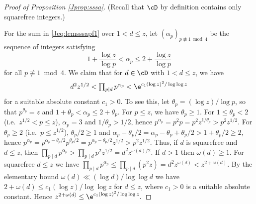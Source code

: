 \documentclass[12pt, reqno, twoside, letterpaper]{amsart}
\begin{document}
\begin{jetsam}
\begin{proof}[Proof of Proposition \ref{Jprop:sssa}]
\noindent 
(Recall that $\cD$ by definition contains only squarefree 
integers.)

For the sum in \eqref{Jeq:lemsssapf1} over $1 < d \le z$, let 
$(\alpha_p)_{p \not\equiv 1 \bmod 4}$ be the sequence of integers 
satisfying 
\[
 1 + \frac{\log z}{\log p}
  < 
   \alpha_p
    \le 
     2 + \frac{\log z}{\log p}
\]
for all $p \not\equiv 1 \bmod 4$.
%
We claim that for $d \in \cD$ with $1 < d \le z$, we have 
\begin{equation}
 \label{Jeq:dbnds}
  \textstyle 
   d^2z^{1/2}
   <
    \prod_{p \mid d} p^{\alpha_p}
     <
      \e^{c_1(\log z)^2/\log\log z} 
\end{equation}
for a suitable absolute constant $c_1 > 0$.
%
To see this, let $\theta_p = (\log z)/\log p$, so that 
$p^{\theta_p} = z$ and $1 + \theta_p < \alpha_p \le 2 + \theta_p$.
%
For $p \le z$, we have $\theta_p \ge 1$.
%
For $1 \le \theta_p < 2$ (i.e.\ $z^{1/2} < p \le z$), 
$\alpha_p = 3$ and $1/\theta_p > 1/2$, hence 
$
 p^{\alpha_p} 
  = 
   p^2p
    =
     p^2z^{1/\theta_p}
      >
       p^2z^{1/2}
$.
%
For $\theta_p \ge 2$ (i.e.\ $p \le z^{1/2}$), $\theta_p/2 \ge 1$ 
and 
$
 \alpha_p - \theta_p/2 
  = 
   \alpha_p - \theta_p + \theta_p/2
    > 1 + \theta_p/2
     \ge 
      2
$,
hence 
$
 p^{\alpha_p}
  =
   p^{\alpha_p - \theta_p/2}p^{\theta_p/2}
     =
      p^{\alpha_p - \theta_p/2}z^{1/2}
       > p^2z^{1/2}
$.
%
Thus, if $d$ is squarefree and $d \le z$, then 
$
 \prod_{p \mid d} p^{\alpha_p}
  > 
   \prod_{p \mid d} p^2z^{1/2}
    = 
     d^2z^{\omega(d)/2}
$.
%
If $d > 1$ then $\omega(d) \ge 1$.
%
For squarefree $d \le z$ we have  
$
 \prod_{p \mid d} p^{\alpha_p}
  \le 
   \prod_{p \mid d} (p^2z)
    = 
     d^2z^{\omega(d)}
      <
       z^{2 + \omega(d)}
$.
%
By the elementary bound $\omega(d) \ll (\log d)/\log\log d$ we 
have 
$
 2 + \omega(d) \le c_1(\log z)/\log\log z
$
for $d \le z$, where $c_1 > 0$ is a suitable absolute constant.
%
Hence 
$
 z^{2 + \omega(d)} 
  \le 
   \e^{c_1(\log z)^2/\log\log z}.
$


\end{proof}
\end{jetsam}
\end{document}
